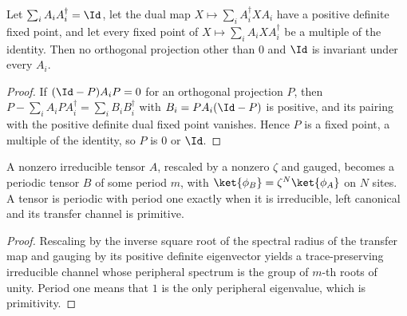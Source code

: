 \begin{lemma}%
    \label{lem:pgvwc07_block_irreducible}
    \leanok
    Let $\sum_iA_iA_i^\dagger=\Id$, let the dual map
    $X\mapsto\sum_iA_i^\dagger XA_i$ have a positive definite fixed point, and let
    every fixed point of $X\mapsto\sum_iA_iXA_i^\dagger$ be a multiple of the
    identity. Then no orthogonal projection other than $0$ and $\Id$ is invariant
    under every $A_i$.
\end{lemma}

\begin{proof}
    \leanok
    If $(\Id-P)A_iP=0$ for an orthogonal projection $P$, then
    $P-\sum_iA_iPA_i^\dagger=\sum_iB_iB_i^\dagger$ with $B_i=PA_i(\Id-P)$ is
    positive, and its pairing with the positive definite dual fixed point
    vanishes. Hence $P$ is a fixed point, a multiple of the identity, so $P$ is
    $0$ or $\Id$.
\end{proof}

\begin{lemma}%
    \label{lem:periodic_scale_of_irreducible}
    \leanok
    A nonzero irreducible tensor $A$, rescaled by a nonzero $\zeta$ and gauged,
    becomes a periodic tensor $B$ of some period $m$, with
    $\ket{\phi_B}=\zeta^N\ket{\phi_A}$ on $N$ sites. A tensor is periodic with
    period one exactly when it is irreducible, left canonical and its transfer
    channel is primitive.
\end{lemma}

\begin{proof}
    \leanok
    Rescaling by the inverse square root of the spectral radius of the
    transfer map and gauging by its positive definite eigenvector yields a
    trace-preserving irreducible channel whose peripheral spectrum is the
    group of $m$-th roots of unity. Period one means that $1$ is the only
    peripheral eigenvalue, which is primitivity.
\end{proof}

